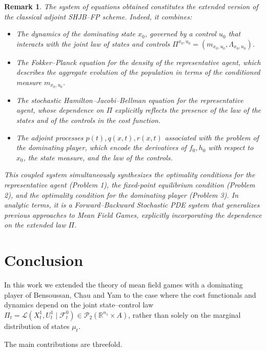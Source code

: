 \documentclass[12pt]{article}
\newtheorem*{obs*}{Remark}
\theoremstyle{definition}
\begin{document}
\begin{obs*}
The system of equations obtained constitutes the extended version of the classical adjoint SHJB--FP scheme. Indeed, it combines:

\begin{itemize}
    \item The dynamics of the dominating state \(x_0\), governed by a control \(u_0\) that interacts with the joint law of states and controls \(\Pi^{x_0,u_0}=(m_{x_0,u_0}, \Lambda_{x_0,u_0})\).
    \item The Fokker--Planck equation for the density of the representative agent, which describes the aggregate evolution of the population in terms of the conditioned measure \(m_{x_0,u_0}\).
    \item The stochastic Hamilton--Jacobi--Bellman equation for the representative agent, whose dependence on \(\Pi\) explicitly reflects the presence of the law of the states and of the controls in the cost function.
    \item The adjoint processes \(p(t), q(x,t), r(x,t)\) associated with the problem of the dominating player, which encode the derivatives of \(f_0,h_0\) with respect to \(x_0\), the state measure, and the law of the controls.
\end{itemize}

This coupled system simultaneously synthesizes the optimality conditions for the representative agent (Problem 1), the fixed-point equilibrium condition (Problem 2), and the optimality condition for the dominating player (Problem 3). In analytic terms, it is a Forward--Backward Stochastic PDE system that generalizes previous approaches to Mean Field Games, explicitly incorporating the dependence on the extended law \(\Pi\).
\end{obs*}

\section{Conclusion}

In this work we extended the theory of mean field games with a dominating player of Bensoussan, Chau and Yam \cite{bensoussan2014mfgdominating} to the case where the cost functionals and dynamics depend on the joint state--control law $\Pi_t = \mathcal{L}(X_t^1, U_t^1 \mid \mathcal{F}_t^0) \in \mathcal{P}_2(\mathbb{R}^{n_1} \times A)$, rather than solely on the marginal distribution of states $\mu_t$.

The main contributions are threefold.
\end{document}
